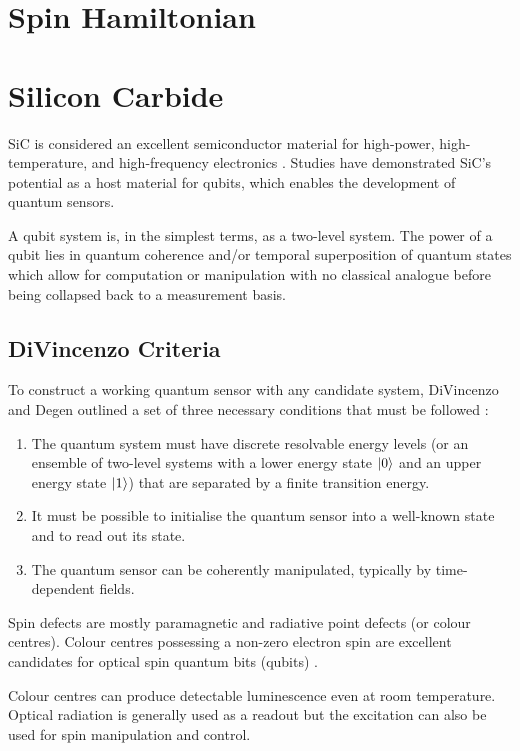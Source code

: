 \section{Spin Hamiltonian}

 
\section{Silicon Carbide}\label{SiC}
SiC is considered an excellent semiconductor material for high-power, high-temperature, and high-frequency electronics \cite{Eddy2009,CASADY19961409}. Studies have demonstrated SiC's potential as a host material for qubits, which enables the development of quantum sensors. 

A qubit system is, in the simplest terms, as a two-level system. The power of a qubit lies in quantum coherence and/or
temporal superposition of quantum states which allow for computation or manipulation with no classical analogue before being collapsed back to a measurement basis. 


\subsection{DiVincenzo Criteria}
To construct a working quantum sensor with any candidate system, DiVincenzo and Degen outlined a set of three necessary conditions that must be followed \cite{Crawford2021, RevModPhys.89.035002}
: 
\begin{enumerate}
    \item The quantum system must have discrete resolvable energy levels (or an ensemble of two-level systems with a lower energy state $\ket{0}$ and an upper energy state $\ket{1}$) that are separated by a finite transition energy. 
    \item It must be possible to initialise the quantum sensor into a well-known state and to read out its state. 
    \item The quantum sensor can be coherently manipulated, typically by time-dependent fields.
\end{enumerate} 

Spin defects are mostly paramagnetic and radiative point defects (or colour centres). Colour centres possessing a 
non-zero electron spin are excellent candidates for optical spin
quantum bits (qubits) \cite{Castelletto_2024}.

Colour centres can produce detectable luminescence even at room temperature. Optical radiation is generally used as a readout but the excitation can also be used for spin manipulation and control.

